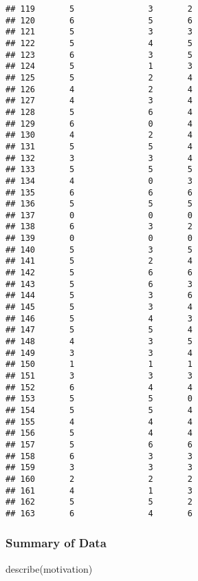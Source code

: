 \documentclass[
]{article}
\newenvironment{Shaded}{\begin{snugshade}}{\end{snugshade}}
\newcommand{\FunctionTok}[1]{\textcolor[rgb]{0.00,0.00,0.00}{#1}}
\newcommand{\NormalTok}[1]{#1}
\begin{document}
\begin{verbatim}
## 119       5               3       2
## 120       6               5       6
## 121       5               3       3
## 122       5               4       5
## 123       6               3       5
## 124       5               1       3
## 125       5               2       4
## 126       4               2       4
## 127       4               3       4
## 128       5               6       4
## 129       6               0       4
## 130       4               2       4
## 131       5               5       4
## 132       3               3       4
## 133       5               5       5
## 134       4               0       3
## 135       6               6       6
## 136       5               5       5
## 137       0               0       0
## 138       6               3       2
## 139       0               0       0
## 140       5               3       5
## 141       5               2       4
## 142       5               6       6
## 143       5               6       3
## 144       5               3       6
## 145       5               3       4
## 146       5               4       3
## 147       5               5       4
## 148       4               3       5
## 149       3               3       4
## 150       1               1       1
## 151       3               3       3
## 152       6               4       4
## 153       5               5       0
## 154       5               5       4
## 155       4               4       4
## 156       5               4       4
## 157       5               6       6
## 158       6               3       3
## 159       3               3       3
## 160       2               2       2
## 161       4               1       3
## 162       5               5       2
## 163       6               4       6
\end{verbatim}

\hypertarget{summary-of-data}{%
\subsubsection{Summary of Data}\label{summary-of-data}}

\begin{Shaded}
\begin{Highlighting}[]
\FunctionTok{describe}\NormalTok{(motivation)}
\end{Highlighting}
\end{Shaded}
\end{document}

